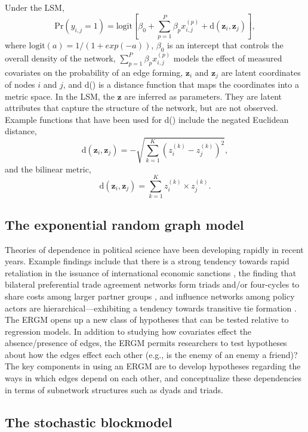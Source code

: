 \documentclass[fleqn,12pt]{wlscirep}
\begin{document}
Under the LSM, $$\text{Pr}(y_{i,j} = 1) = \text{logit}\left[\beta_0 + \sum_{p = 1}^P \beta_p x_{i,j}^{(p)} + \text{d}(\bm{z}_i,\bm{z}_j) \right],$$ where  $\text{logit}(a) = 1/(1+exp(-a))$, $\beta_0$ is an intercept that controls the overall density of the network, $\sum_{p = 1}^P \beta_p x_{i,j}^{(p)}$ models the effect of measured covariates on the probability of an edge forming,  $\bm{z}_i$ and $\bm{z}_j$ are latent coordinates of nodes $i$ and $j$, and d() is a distance function that maps the coordinates into a metric space. In the LSM, the $\bm{z}$ are inferred as parameters. They are latent attributes that capture the structure of the network, but are not observed. Example functions that have been used for d() include the negated Euclidean distance, $$ \text{d}(\bm{z}_i,\bm{z}_j)  = -\sqrt{ \sum_{k=1}^K \left( z_i^{(k)} - z_j^{(k)} \right)^2}, $$ and the bilinear metric, $$ \text{d}(\bm{z}_i,\bm{z}_j)  =  \sum_{k=1}^K  z_i^{(k)}\times z_j^{(k)}.  $$



\subsection{The exponential random graph model}

Theories of dependence in political science have been developing rapidly in recent years. Example findings include that there is a strong tendency towards rapid retaliation in the issuance of international economic sanctions \citep{cranmer2014reciprocity}, the finding that bilateral preferential trade agreement networks form triads and/or four-cycles to share costs among larger partner groups \citep{milewicz2018beyond}, and influence networks among policy actors are hierarchical---exhibiting a tendency towards transitive tie formation \citep{christopoulos2015exceptional}.  The ERGM opens up a new class of hypotheses that can be tested relative to regression models. In addition to studying how covariates effect the absence/presence of edges, the ERGM permits researchers to test hypotheses about how the edges effect each other (e.g., is the enemy of an enemy a friend)? The key components in using an ERGM are to develop hypotheses regarding the ways in which edges depend on each other, and conceptualize these dependencies in terms of subnetwork structures such as dyads and triads.


\subsection{The stochastic blockmodel}
\end{document}
